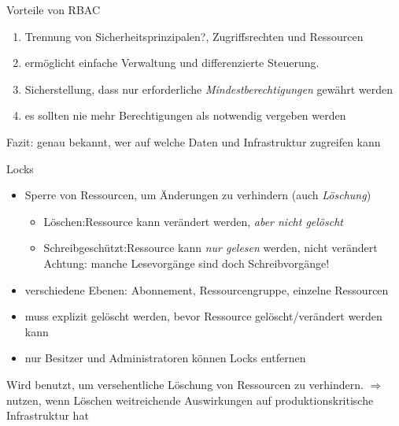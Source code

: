 \begin{flashcard}[]{Vorteile von RBAC}
    \begin{enumerate}
        \item Trennung von Sicherheitsprinzipalen?, Zugriffsrechten und Ressourcen
        \item ermöglicht einfache Verwaltung und differenzierte Steuerung.
        \item Sicherstellung, dass nur erforderliche \emph{Mindestberechtigungen} gewährt werden
        \item[$\Rightarrow$] es sollten nie mehr Berechtigungen als notwendig vergeben werden
    \end{enumerate}
    Fazit: genau bekannt, wer auf welche Daten und Infrastruktur zugreifen kann
\end{flashcard}

\begin{flashcard}[Describe]{Locks}
    \begin{itemize}
        \item Sperre von Ressourcen, um Änderungen zu verhindern (auch \emph{Löschung})
        \begin{itemize}
            \item Löschen:\newline Ressource kann verändert werden, \emph{aber nicht gelöscht}
            \item Schreibgeschützt:\newline Ressource kann \emph{nur gelesen} werden, nicht verändert\newline
            Achtung: manche Lesevorgänge sind doch Schreibvorgänge!
        \end{itemize}
        \item verschiedene Ebenen: Abonnement, Ressourcengruppe, einzelne Ressourcen
        \item muss explizit gelöscht werden, bevor Ressource gelöscht/verändert werden kann
        \item nur Besitzer und Administratoren können Locks entfernen
    \end{itemize}
    
    Wird benutzt, um versehentliche Löschung von Ressourcen zu verhindern. \newline
    $\Rightarrow$ nutzen, wenn Löschen weitreichende Auswirkungen auf produktionskritische Infrastruktur hat

\end{flashcard}

